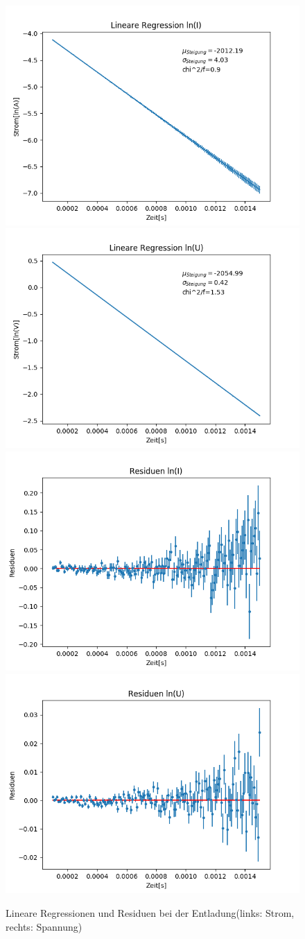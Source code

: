 \documentclass[12pt,a4paper]{article}
\begin{document}
\begin{figure}
\begin{center}
\includegraphics[width=0.49\linewidth]{Bilder/Kondensator_ent_linI}
\includegraphics[width=0.49\linewidth]{Bilder/Kondensator_ent_linU}
\includegraphics[width=0.49\linewidth]{Bilder/Kondensator_ent_resI}
\includegraphics[width=0.49\linewidth]{Bilder/Kondensator_ent_resU}
\caption[Rohdaten logarith. A]{Lineare Regressionen und Residuen bei der Entladung(links: Strom, rechts: Spannung)}
\label{fig:linEnt}
\end{center}
\end{figure}
\end{document}

